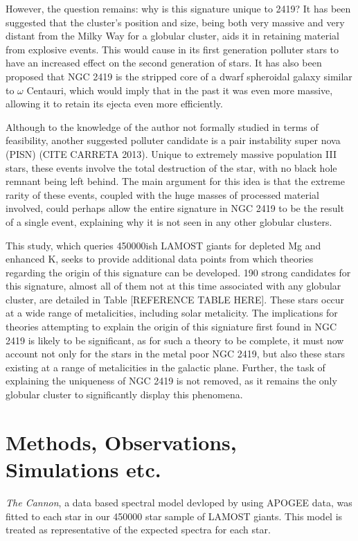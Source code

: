 \documentclass[a4paper,fleqn,usenatbib]{mnras}
\begin{document}
However, the question remains: why is this signature unique to 2419? It has been suggested that the cluster's position and size, being both very massive and very distant from the Milky Way for a globular cluster, aids it in retaining material from explosive events. This would cause in its first generation polluter stars to have an increased effect on the second generation of stars. It has also been proposed that NGC 2419 is the stripped core of a dwarf spheroidal galaxy similar to $\omega$ Centauri, which would imply that in the past it was even more massive, allowing it to retain its ejecta even more efficiently.

Although to the knowledge of the author not formally studied in terms of feasibility, another suggested polluter candidate is a pair instability super nova (PISN) (CITE CARRETA 2013). Unique to extremely massive population III stars, these events involve the total destruction of the star, with no black hole remnant being left behind. The main argument for this idea is that the extreme rarity of these events, coupled with the huge masses of processed material involved, could perhaps allow the entire signature in NGC 2419 to be the result of a single event, explaining why it is not seen in any other globular clusters.

This study, which queries 450000ish LAMOST giants for depleted Mg and enhanced K, seeks to provide additional data points from which theories regarding the origin of this signature can be developed. 190 strong candidates for this signature, almost all of them not at this time associated with any globular cluster, are detailed in Table [REFERENCE TABLE HERE]. These stars occur at a wide range of metalicities, including solar metalicity. The implications for theories attempting to explain the origin of this signiature first found in NGC 2419 is likely to be significant, as for such a theory to be complete, it must now account not only for the stars in the metal poor NGC 2419, but also these stars existing at a range of metalicities in the galactic plane. Further, the task of explaining the uniqueness of NGC 2419 is not removed, as it remains the only globular cluster to significantly display this phenomena.

\section{Methods, Observations, Simulations etc.}

\textit{The Cannon}, a data based spectral model devloped by \cite{ho2017} using APOGEE data, was fitted to each star in our 450000 star sample of LAMOST giants.
This model is treated as representative of the expected spectra for each star.
\end{document}
